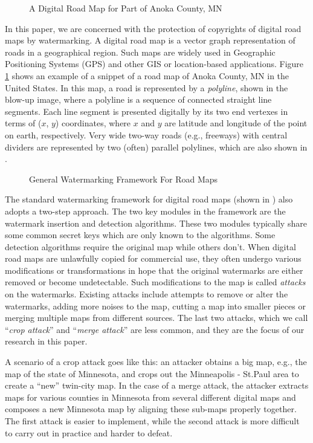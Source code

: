 \begin{figure}[th]
\centering
{}
\caption{A Digital Road Map for Part of Anoka County, MN}
\label{fig:anoka}
\end{figure}

In this paper, we are concerned with the protection of copyrights of
digital road maps by watermarking. A digital road map is a vector graph
representation of roads in a geographical region. Such maps are 
widely used in Geographic Positioning Systems (GPS) and other GIS or
location-based applications.
Figure \ref{fig:anoka} shows an example of a snippet of a
road map of Anoka County, MN in the United States. 
In this map, a road is represented by a {\em polyline}, 
shown in the blow-up image, where a polyline is a sequence of connected
straight line segments. Each line segment is presented digitally by its
two end vertexes in terms of ($x$, $y$) coordinates, where $x$ and $y$ are
latitude and longitude of the point on earth, respectively. Very wide two-way
roads (e.g., freeways) with central dividers are represented by two (often)
parallel polylines, which are also shown in .

\begin{figure}[th]
\centering
{}
\caption{General Watermarking Framework For Road Maps}
\label{fig:workflow}
\end{figure}

The standard watermarking framework for digital road maps 
(shown in ) also adopts a two-step approach.
The two key modules in the framework are the watermark insertion
and detection algorithms. These two modules typically share some
common secret keys which are only known to the algorithms. Some
detection algorithms require the original map while others don't.
When digital road maps are unlawfully copied for commercial use,
they often undergo various modifications or transformations in hope that
the original watermarks are either removed or become undetectable.
Such modifications to the map is called {\em attacks} on the watermarks.
Existing attacks include attempts to remove or alter the watermarks, 
adding more noises to the map, cutting a map into smaller pieces or 
merging multiple maps from different sources. The last two attacks, which
we call ``{\em crop attack}'' and ``{\em merge attack}'' are less common, 
and they are the focus of our research in this paper.  

A scenario of a crop attack goes like this: an attacker obtains a big map, 
e.g., the map of the state of Minnesota, 
and crops out the Minneapolis - St.Paul area 
to create a ``new'' twin-city map. In the case of a merge attack, the attacker
extracts maps for various counties in Minnesota from several different
digital maps and composes a new Minnesota map by aligning these sub-maps
properly together. The first attack is easier to implement, while the second
attack is more difficult to carry out in practice and harder to defeat.
 
